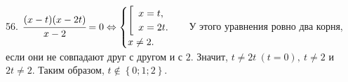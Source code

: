 56. $\cfrac{(x-t)(x-2t)}{x-2}=0\Leftrightarrow\begin{cases}\left[\begin{array}{l}x=t,\\ x=2t.\end{array}\right.\\x\neq2.\end{cases}$
У этого уравнения ровно два корня, если они не совпадают друг с другом и с $2.$ Значит, $t\neq2t\ (t=0),\ t\neq2$ и $2t\neq2.$ Таким образом, $t\notin\left\{0; 1; 2\right\}.$\\
